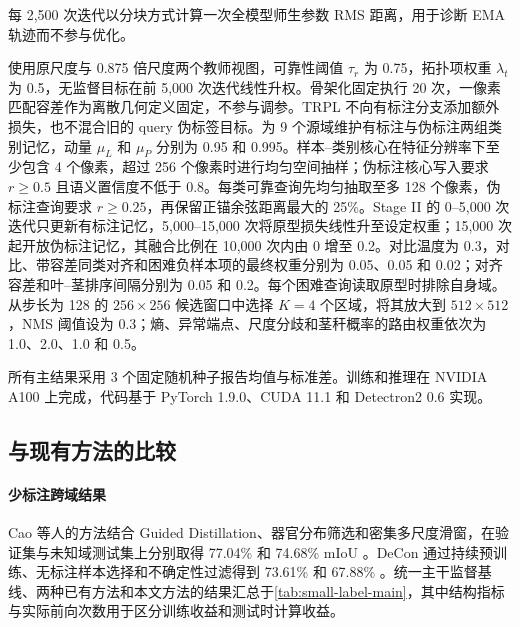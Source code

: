 每 2,500 次迭代以分块方式计算一次全模型师生参数 RMS 距离，用于诊断 EMA 轨迹而不参与优化。

\TRPL 使用原尺度与 0.875 倍尺度两个教师视图，可靠性阈值 $\tau_r$ 为 0.75，拓扑项权重 $\lambda_t$ 为 0.5，无监督目标在前 5,000 次迭代线性升权。骨架化固定执行 20 次，一像素匹配容差作为离散几何定义固定，不参与调参。TRPL 不向有标注分支添加额外损失，也不混合旧的 query 伪标签目标。\TCPM 为 9 个源域维护有标注与伪标注两组类别记忆，动量 $\mu_L$ 和 $\mu_P$ 分别为 0.95 和 0.995。样本--类别核心在特征分辨率下至少包含 4 个像素，超过 256 个像素时进行均匀空间抽样；伪标注核心写入要求 $r\geq0.5$ 且语义置信度不低于 0.8。每类可靠查询先均匀抽取至多 128 个像素，伪标注查询要求 $r\geq0.25$，再保留正锚余弦距离最大的 25\%。Stage II 的 0--5,000 次迭代只更新有标注记忆，5,000--15,000 次将原型损失线性升至设定权重；15,000 次起开放伪标注记忆，其融合比例在 10,000 次内由 0 增至 0.2。对比温度为 0.3，对比、带容差同类对齐和困难负样本项的最终权重分别为 0.05、0.05 和 0.02；对齐容差和叶--茎排序间隔分别为 0.05 和 0.2。每个困难查询读取原型时排除自身域。\BAZR 从步长为 128 的 $256\times256$ 候选窗口中选择 $K=4$ 个区域，将其放大到 $512\times512$，NMS 阈值设为 0.3；熵、异常端点、尺度分歧和茎秆概率的路由权重依次为 1.0、2.0、1.0 和 0.5。

所有主结果采用 3 个固定随机种子报告均值与标准差。训练和推理在 NVIDIA A100 上完成，代码基于 PyTorch 1.9.0、CUDA 11.1 和 Detectron2 0.6 实现。

\subsection{与现有方法的比较}

\paragraph{少标注跨域结果}
Cao 等人的方法结合 Guided Distillation、器官分布筛选和密集多尺度滑窗，在验证集与未知域测试集上分别取得 77.04\% 和 74.68\% mIoU \citep{cao2025detailminority}。DeCon 通过持续预训练、无标注样本选择和不确定性过滤得到 73.61\% 和 67.88\% \citep{ghosh2025decon}。统一主干监督基线、两种已有方法和本文方法的结果汇总于\cref{tab:small-label-main}，其中结构指标与实际前向次数用于区分训练收益和测试时计算收益。

